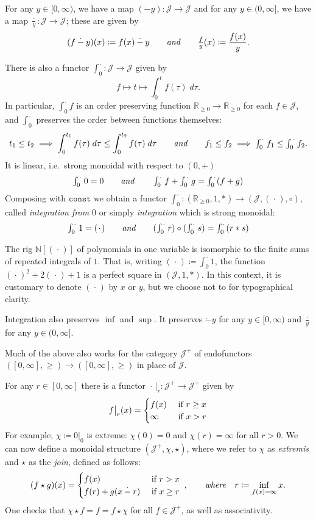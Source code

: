 \documentclass[11pt, one side, article]{memoir}
\theoremstyle{definition}
\theoremstyle{plain}
\newenvironment{remark}
  {\pushQED{\qed}\renewcommand{\qedsymbol}{$\lozenge$}\remarkx}
  {\popQED\endremarkx}
\newcommand{\cat}[1]{\mathcal{#1}}%
\newcommand{\id}{\mathrm{id}}
\newcommand{\tn}[1]{\textnormal{#1}}
\newcommand{\nn}{\mathbb{N}}
\newcommand{\rr}{\mathbb{R}}
\newcommand{\const}{\texttt{const}}
\newcommand{\blank}[1][1pt]{\hspace{#1}\cdot\hspace{#1}}
\newcommand{\rest}[2][\blank]{#1\big|_{#2}}
\newcommand{\hh}[2][]{#1 \tn{\textit{#2}} #1}
\newcommand{\qqand}{\hh[\qquad]{and}}
\newcommand{\hi}[4][]{#1 #2 \tn{\textit{#4}} #3}
\newcommand{\where}[1][,]{\hi[#1]{\qquad}{\quad}{where}}
\newcommand{\rrnon}{\rr_{\geq0}}
\newcommand{\dotminus}{\mathbin{\dot{-}}}
\renewcommand{\d}[1]{\;d #1}
\newcommand{\varint}{\textstyle\int}
\newcommand{\intzero}[1][\blank]{\varint_0^{#1}}
\newcommand{\xid}[1][\blank]{(#1)}
\begin{document}

For any $y\in[0,\infty)$, we have a map $(\dotminus y)\colon\cat{J}\to\cat{J}$ and for any $y\in(0,\infty]$, we have a map $\frac{\blank}{y}\colon\cat{J}\to\cat{J}$; these are given by
\[
	(f\dotminus y)(x)\coloneqq f(x)\dotminus y
	\qqand
	\textstyle\frac{f}{y}(x)\displaystyle\coloneqq \frac{f(x)}{y}.
\]

There is also a functor $\intzero\colon\cat{J}\to\cat{J}$ given by
\[
f\mapsto t\mapsto\int_0^t f(\tau) \d \tau.
\]
In particular, $\intzero f$ is an order preserving function $\rrnon\to\rrnon$ for each $f\in\cat{J}$, and $\intzero$ preserves the order between functions themselves:
\[
t_1\leq 
t_2
\implies 
\int_0^{t_1}f(\tau)\d\tau\leq
\int_0^{t_2}f(\tau)\d\tau
\qqand
f_1\leq 
f_2
\implies
\intzero f_1\leq
\intzero f_2.
\]
It is linear, i.e.\ strong monoidal with respect to $(0,+)$
\[
\intzero 0=0
\qqand
\intzero f+\intzero g=\intzero (f+g)
\]
Composing with $\const$ we obtain a functor $\intzero\colon(\rrnon,1,*)\to(\cat{J},\xid,\circ)$, called  \emph{integration from $0$} or simply \emph{integration} which is strong monoidal:
\[
\intzero 1=\xid
\qqand
(\intzero r)\circ(\intzero s)=\intzero(r*s)
\]

\begin{remark}
The rig $\nn[\xid]$ of polynomials in one variable is isomorphic to the finite sums of repeated integrals of $1$. That is, writing $\xid\coloneqq\intzero 1$, the function $\xid^2+2\xid+1$ is a perfect square in $(\cat{J},1,*)$. In this context, it is customary to denote $\xid$ by $x$ or $y$, but we choose not to for typographical clarity.
\end{remark}

Integration also preserves $\inf$ and $\sup$. It preserves $\dotminus y$ for any $y\in[0,\infty)$ and $\frac{\blank}{y}$ for any $y\in(0,\infty]$.

Much of the above also works for the category $\cat{J}^+$ of endofunctors $([0,\infty],\geq)\to([0,\infty],\geq)$ in place of $\cat{J}$. 

For any $r\in[0,\infty]$ there is a functor $\rest{r}\colon\cat{J}^+\to\cat{J}^+$ given by
\[
\rest[f]{r}(x)=
	\begin{cases}
		f(x)&\tn{ if }r\geq x\\
		\infty&\tn{ if } x>r
	\end{cases}
\]
For example, $\chi\coloneqq\rest[0]{0}$ is extreme: $\chi(0)=0$ and $\chi(r)=\infty$ for all $r>0$. 
We can now define a monoidal structure $(\cat{J}^+,\chi,\star)$, where we refer to $\chi$ as \emph{extremis} and $\star$ as the \emph{join}, defined as follows:
\[
(f\star g)(x)=
\begin{cases}
	f(x)&\tn{ if }r> x\\
	f(r)+g(x\dotminus r)&\tn{ if }x\geq r
\end{cases}
\;\where
r\coloneqq\inf_{f(x)=\infty}x.
\]
One checks that $\chi\star f=f=f\star\chi$ for all $f\in\cat{J}^+$, as well as associativity.
\end{document}
